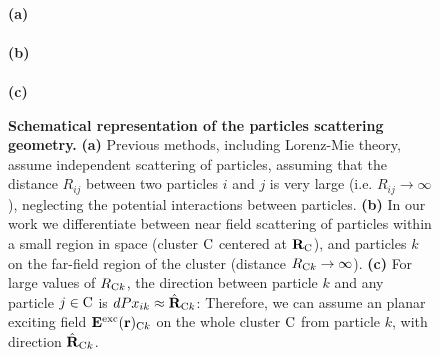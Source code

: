 \begin{figure}[!ht]
	\centering
	\def\svgwidth{.5\textwidth}
	 \\ [8pt]  
	\textbf{(a)} \\
	\def\svgwidth{.5\textwidth}
	 \\ [-5pt]
	\textbf{(b)} \\ [5pt]
	\def\svgwidth{.5\textwidth}
	 \\ [-5pt]
	\textbf{(c)}
	
	\caption[Schematical representation of the particles scattering geometry]{\label{fig:waveoptics:diagram}
	  	\textbf{Schematical representation of the particles scattering geometry.} \textbf{(a)} Previous methods, including Lorenz-Mie theory, assume independent scattering of particles, assuming that the distance $R_{ij}$ between two particles $i$ and $j$ is very large (i.e. $R_{ij}\rightarrow\infty$), neglecting the potential interactions between particles. \textbf{(b)} In our work  we differentiate between near field scattering of particles within a small region in space (cluster $\mathrm{C}$ centered at $\mathbf{R}_{\mathrm{C}}$), and particles $k$ on the far-field region of the cluster (distance $R_{\mathrm{C} k}\rightarrow\infty$). \textbf{(c)} For large values of $R_{\mathrm{C} k}$, the direction between particle $k$ and any particle $j\in\mathrm{C}$ is $dPx_{ik}\approx\hat{\mathbf{R}}_{\mathrm{C} k}$: Therefore, we can assume an planar exciting field $\mathbf{E}^\mathrm{exc}(\mathbf{r})_{\mathrm{C} k}$ on the whole cluster $\mathrm{C}$ from particle $k$, with direction $\hat{\mathbf{R}}_{\mathrm{C} k}$. 
	}
\end{figure}